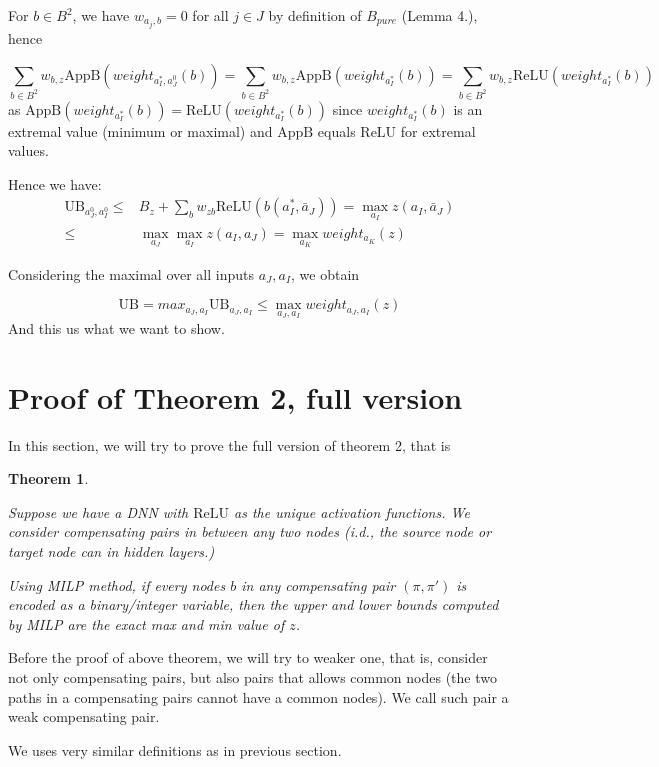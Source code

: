\documentclass[]{article}
\newtheorem{theorem}{Theorem}
\theoremstyle{definition}
\newcommand{\ReLU}{\mathrm{ReLU}}
\begin{document}
For $b \in B^2$, we have $w_{a_j,b}=0$ for all $j \in J$
by definition of $B_{pure}$ (Lemma 4.), hence

$$\sum_{b\in B^2} w_{b,z} \mathrm{AppB}(weight_{a^*_I,a^0_J}(b)) = 
\sum_{b\in B^2} w_{b,z} \mathrm{AppB}(weight_{a^*_I}(b))
=\sum_{b\in B^2} w_{b,z} \mathrm{ReLU}(weight_{a^*_I}(b))
$$ as $\mathrm{AppB}(weight_{a^*_I}(b))=\mathrm{ReLU}(weight_{a^*_I}(b))$ since 
$weight_{a^*_I}(b)$ is an extremal value (minimum or maximal) and 
$\mathrm{AppB}$ equals $\mathrm{ReLU}$ for extremal values.

Hence we have: \begin{align*}
	\mathrm{UB}_{a^0_J,a^0_I}  \leq & B_z+\sum_{b}w_{zb}\ReLU(b(a_I^*,\bar{a}_J))
	= \max_{a_I} z(a_I,\bar{a}_J) \\
	\leq & \max_{a_J}\max_{a_I} z(a_I,a_J) 	= \max_{a_K} weight_{a_K}(z)
\end{align*}

Considering the maximal over all inputs $a_J,a_I$, we obtain 

$$\mathrm{UB} = max_{a_J,a_I} \mathrm{UB}_{a_J,a_I} \leq \max_{a_J,a_I} weight_{a_J,a_I}(z)$$ And this us what we want to show.


\section{Proof of Theorem 2, full version}

In this section, we will try to prove the full version of theorem 2, that is 

\begin{theorem}
	\label{no_diamond_3}
	
	Suppose we have a DNN with $\ReLU$ as the unique activation functions. We consider compensating pairs in between any two nodes (i.d., the source node or target node can in hidden layers.)
	
	Using MILP method, if every nodes $b$ in any compensating pair
	$(\pi,\pi')$ is encoded as a binary/integer variable, then the upper and lower 
	bounds computed by MILP are the exact max and min value of $z$.
\end{theorem}


Before the proof of above theorem, we will try to weaker one, that is, consider not only compensating pairs, but also pairs that allows common nodes (the two paths in a compensating pairs cannot have a common nodes). We call such pair a weak compensating pair.

We uses very similar definitions as in previous section.
\end{document}
